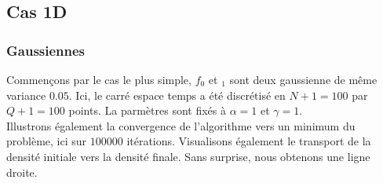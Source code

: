 \documentclass[a4paper,12pt]{article}
\begin{document}
\newpage
\subsection{Cas 1D}
\subsubsection{Gaussiennes}
Commençons par le cas le plus simple, $f_0$ et $_1$ sont deux gaussienne de même variance $0.05$. Ici, le carré espace temps a été discrétisé en $N +1=100$ par $Q+1=100$ points. La parmètres sont fixés à $\alpha = 1$ et $\gamma = 1$.\\
Illustrons également la convergence de l'algorithme vers un minimum du problème, ici sur $100000$ itérations. Visualisons également le transport de la densité initiale vers la densité finale. Sans surprise, nous obtenons une ligne droite.
\end{document}
